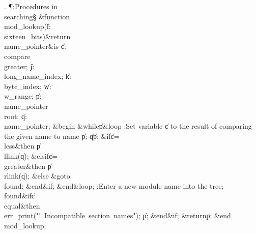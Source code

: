 . \P\?:Procedures in \\{searching}\X\mathrel{+}\S\?\6
\&{function}\8\1\\{mod\_lookup}\?(\1\?\|l\?:\?\\{sixteen\_bits}\?\2)\&{return}%
\?\8\\{name\_pointer}\2\8\&{is}\8\1\6
\|c\?:\?\\{compare}\?\K\?\\{greater};\6
\|j\?:\?\\{long\_name\_index};\6
\|k\?:\?\\{byte\_index};\6
\|w\?:\?\\{w\_range};\6
\|p\?:\?\\{name\_pointer}\?\K\?\\{root};\6
\|q\?:\?\\{name\_pointer}\?\K{};\6
\4\&{begin}\6
\1\&{while}\8\|p\?\I{}\8\&{loop}\6
:Set variable \|c to the result of comparing the given name to name \|p\X;\6
\|q\?\K\?\|p;\6
\&{if}\1\1\8\|c\?=\?\\{less}\2\8\&{then}\6
\|p\?\K\?\\{llink}\?\1(\?\|q\?\2)\?;\6
\4\&{elsif}\1\8\|c\?=\?\\{greater}\2\8\&{then}\6
\|p\?\K\?\\{rlink}\?\1(\?\|q\?\2)\?;\6
\4\&{else}\6
\&{goto}\8\\{found};\2\6
\&{end}\8\2\&{if}\1;\2\6
\&{end}\8\&{loop};\6
:Enter a new module name into the tree\X;\6
\4\BL\\{found}\EL\8\&{if}\1\1\8\|c\?\I\?\\{equal}\2\8\&{then}\6
\\{err\_print}\?\1(\?\.{"!\ Incompatible\ section\ names"}\?\2)\?;\5
\|p\?\K{};\2\6
\&{end}\8\2\&{if}\1;\6
\?\&{return}\?\8\|p;\2\6
\&{end}\8\\{mod\_lookup};\par
\fi

